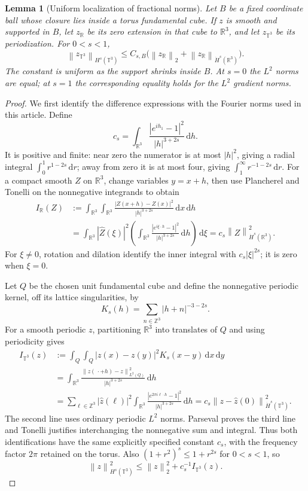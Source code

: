 \documentclass[11pt,a4paper]{article}
\newtheorem{lemma}[theorem]{Lemma}
\theoremstyle{definition}\newtheorem{definition}[theorem]{Definition}
\theoremstyle{remark}\newtheorem{remark}[theorem]{Remark}
\newcommand{\R}{\mathbb R}\newcommand{\TT}{\mathbb T^3}
\newcommand{\dd}{\,\mathrm d}\newcommand{\eps}{\varepsilon}
\newcommand{\norm}[1]{\left\lVert#1\right\rVert}
\begin{document}
\begin{lemma}[Uniform localization of fractional norms]\label{lem:localization}
Let $B$ be a fixed coordinate ball whose closure lies inside a torus fundamental cube. If $z$ is smooth and supported in $B$, let $z_{\R}$ be its zero extension in that cube to $\R^3$, and let $z_{\TT}$ be its periodization. For $0<s<1$,
\begin{equation}\label{eq:localization}
 \norm{z_{\TT}}_{H^s(\TT)}
 \le C_{s,B}\bigl(\norm{z_{\R}}_2+
                   \norm{z_{\R}}_{\dot H^s(\R^3)}\bigr).
\end{equation}
The constant is uniform as the support shrinks inside $B$. At $s=0$ the $L^2$ norms are equal; at $s=1$ the corresponding equality holds for the $L^2$ gradient norms.
\end{lemma}
\begin{proof}
We first identify the difference expressions with the Fourier norms used
in this article. Define
\[
 c_s=\int_{\R^3}\frac{|e^{ih_1}-1|^2}{|h|^{3+2s}}\dd h.
\]
It is positive and finite: near zero the numerator is at most $|h|^2$,
giving a radial integral $\int_0^1r^{1-2s}\dd r$; away from zero it is at
most four, giving $\int_1^\infty r^{-1-2s}\dd r$.
For a compact smooth $Z$ on $\R^3$, change variables $y=x+h$, then use
Plancherel and Tonelli on the nonnegative integrands to obtain
\begin{align*}
 I_{\R}(Z)&:=\int_{\R^3}\int_{\R^3}
       \frac{|Z(x+h)-Z(x)|^2}{|h|^{3+2s}}\dd x\dd h\\
 &=\int_{\R^3}|\widehat Z(\xi)|^2
       \left(\int_{\R^3}\frac{|e^{i\xi\cdot h}-1|^2}
                                      {|h|^{3+2s}}\dd h\right)\dd\xi
 =c_s\norm{Z}_{\dot H^s(\R^3)}^2.
\end{align*}
For $\xi\ne0$, rotation and dilation identify the inner integral with
$c_s|\xi|^{2s}$; it is zero when $\xi=0$.

Let $Q$ be the chosen unit fundamental cube and define the nonnegative
periodic kernel, off its lattice singularities, by
\[
 K_s(h)=\sum_{n\in\mathbb Z^3}|h+n|^{-3-2s}.
\]
For a smooth periodic $z$, partitioning $\R^3$ into translates of $Q$ and
using periodicity gives
\begin{align*}
 I_{\TT}(z)&:=\int_Q\int_Q|z(x)-z(y)|^2K_s(x-y)\dd x\dd y\\
 &=\int_{\R^3}\frac{\norm{z(\,\cdot+h)-z}_{L^2(Q)}^2}
                            {|h|^{3+2s}}\dd h\\
 &=\sum_{\ell\in\mathbb Z^3}|\widehat z(\ell)|^2
       \int_{\R^3}\frac{|e^{2\pi i\ell\cdot h}-1|^2}
                            {|h|^{3+2s}}\dd h
 =c_s\norm{z-\widehat z(0)}_{\dot H^s(\TT)}^2.
\end{align*}
The second line uses ordinary periodic $L^2$ norms. Parseval proves the
third line and Tonelli justifies interchanging the nonnegative sum and
integral. Thus both identifications have the same explicitly specified
constant $c_s$, with the frequency factor $2\pi$ retained on the torus.
Also $(1+r^2)^s\le1+r^{2s}$ for $0<s<1$, so
\[
 \norm{z}_{H^s(\TT)}^2
 \le\norm{z}_2^2+c_s^{-1}I_{\TT}(z).
\]


\end{proof}
\end{document}
